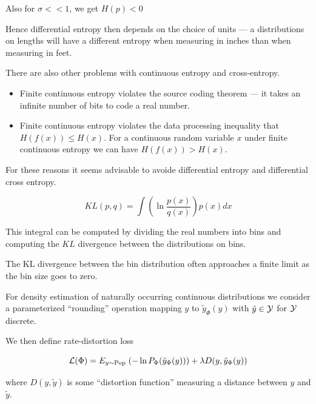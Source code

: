 {\vfill
Also for $\sigma << 1$, we get $H(p) < 0$

\vfill
Hence differential entropy then depends on the choice of units --- a distributions on lengths will have a different entropy
when measuring in inches than when measuring in feet.


There are also other problems with continuous entropy and cross-entropy.

\vfill
\begin{itemize}
\item Finite continuous entropy violates the source coding theorem --- it takes an infinite number of bits to code a real number.

\vfill
\item Finite continuous entropy violates the data processing inequality that $H(f(x)) \leq H(x)$.  For a continuous random variable $x$ under finite continuous entropy we can have $H(f(x)) > H(x)$.
\end{itemize}

\vfill
For these reasons it seems advisable to avoide differential entropy and differential cross entropy.


$$KL(p,q) = \int \left( \ln \frac{p(x)}{q(x)}\right) p(x) dx$$

\vfill
This integral can be computed by dividing the real numbers into bins and computing the $KL$ divergence between the distributions on bins.

\vfill
The KL divergence between the bin distribution often approaches a finite limit as the bin size goes to zero.

For density estimation of naturally occurring continuous distributions we consider
a parameterized ``rounding'' operation mapping $y$ to $\tilde{y}_\Phi(y)$ with $\tilde{y} \in {\cal Y}$ for ${\cal Y}$ discrete.

\vfill
We then define rate-distortion loss

\vfill
$${\cal L}(\Phi) = E_{y \sim \mathrm{Pop}}\;(- \ln P_\Phi(\tilde{y}_\Phi(y))) + \lambda D(y,\tilde{y}_\Phi(y))$$

\vfill
where $D(y,\tilde{y})$ is some ``distortion function'' measuring a distance between $y$ and $\tilde{y}$.


}
